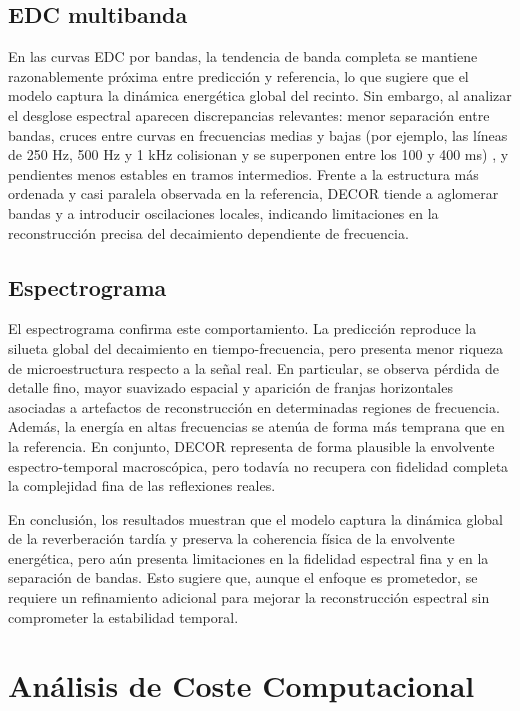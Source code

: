 \subsection*{EDC multibanda}

En las curvas EDC por bandas, la tendencia de banda completa se mantiene razonablemente próxima entre predicción y referencia, lo que sugiere que el modelo captura la dinámica energética global del recinto. Sin embargo, al analizar el desglose espectral aparecen discrepancias relevantes: menor separación entre bandas, cruces entre curvas en frecuencias medias y bajas (por ejemplo, las líneas de 250 Hz, 500 Hz y 1 kHz colisionan y se superponen entre los 100 y 400 ms) , y pendientes menos estables en tramos intermedios. Frente a la estructura más ordenada y casi paralela observada en la referencia, DECOR tiende a aglomerar bandas y a introducir oscilaciones locales, indicando limitaciones en la reconstrucción precisa del decaimiento dependiente de frecuencia.

\subsection*{Espectrograma}

El espectrograma confirma este comportamiento. La predicción reproduce la silueta global del decaimiento en tiempo-frecuencia, pero presenta menor riqueza de microestructura respecto a la señal real. En particular, se observa pérdida de detalle fino, mayor suavizado espacial y aparición de franjas horizontales asociadas a artefactos de reconstrucción en determinadas regiones de frecuencia. Además, la energía en altas frecuencias se atenúa de forma más temprana que en la referencia. En conjunto, DECOR representa de forma plausible la envolvente espectro-temporal macroscópica, pero todavía no recupera con fidelidad completa la complejidad fina de las reflexiones reales.

En conclusión, los resultados muestran que el modelo captura la dinámica global de la reverberación tardía y preserva la coherencia física de la envolvente energética, pero aún presenta limitaciones en la fidelidad espectral fina y en la separación de bandas. Esto sugiere que, aunque el enfoque es prometedor, se requiere un refinamiento adicional para mejorar la reconstrucción espectral sin comprometer la estabilidad temporal.

\section{Análisis de Coste Computacional}

